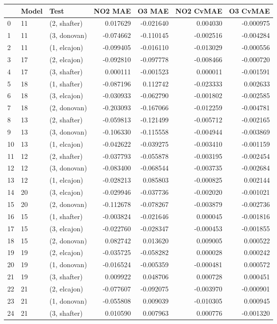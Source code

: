 \begin{tabular}{lllrrrr}
\toprule
{} & Model &          Test &   NO2 MAE &    O3 MAE &  NO2 CvMAE &  O3 CvMAE \\
\midrule
0  &    11 &  (2, shafter) &  0.017629 & -0.021640 &   0.004030 & -0.000975 \\
1  &    11 &  (3, donovan) & -0.074662 & -0.110145 &  -0.002516 & -0.004284 \\
2  &    11 &  (1, elcajon) & -0.099405 & -0.016110 &  -0.013029 & -0.000556 \\
3  &    17 &  (2, elcajon) & -0.092810 & -0.097778 &  -0.008466 & -0.000720 \\
4  &    17 &  (3, shafter) &  0.000111 & -0.001523 &   0.000011 & -0.001591 \\
5  &    18 &  (1, shafter) & -0.087196 &  0.112742 &  -0.023333 &  0.002633 \\
6  &    18 &  (3, elcajon) & -0.030933 & -0.062790 &  -0.001802 & -0.002585 \\
7  &    18 &  (2, donovan) & -0.203093 & -0.167066 &  -0.012259 & -0.004781 \\
8  &    13 &  (2, shafter) & -0.059813 & -0.121499 &  -0.005712 & -0.002165 \\
9  &    13 &  (3, donovan) & -0.106330 & -0.115558 &  -0.004944 & -0.003869 \\
10 &    13 &  (1, elcajon) & -0.042622 & -0.039275 &  -0.003410 & -0.001159 \\
11 &    12 &  (2, shafter) & -0.037793 & -0.055878 &  -0.003195 & -0.002454 \\
12 &    12 &  (3, donovan) & -0.083400 & -0.068544 &  -0.003735 & -0.002684 \\
13 &    12 &  (1, elcajon) & -0.028213 &  0.085803 &  -0.000825 &  0.002144 \\
14 &    20 &  (3, elcajon) & -0.029946 & -0.037736 &  -0.002020 & -0.001021 \\
15 &    20 &  (2, donovan) & -0.112678 & -0.078267 &  -0.003879 & -0.002736 \\
16 &    15 &  (1, shafter) & -0.003824 & -0.021646 &   0.000045 & -0.001816 \\
17 &    15 &  (3, elcajon) & -0.022760 & -0.028347 &  -0.000453 & -0.001855 \\
18 &    15 &  (2, donovan) &  0.082742 &  0.013620 &   0.009005 &  0.000522 \\
19 &    19 &  (2, elcajon) & -0.035725 & -0.058282 &   0.000028 &  0.000242 \\
20 &    19 &  (1, donovan) & -0.016524 & -0.005359 &  -0.000481 &  0.000572 \\
21 &    19 &  (3, shafter) &  0.009922 &  0.048706 &   0.000728 &  0.000451 \\
22 &    21 &  (2, elcajon) & -0.077607 & -0.092075 &  -0.003970 & -0.000901 \\
23 &    21 &  (1, donovan) & -0.055808 &  0.009039 &  -0.010305 &  0.000945 \\
24 &    21 &  (3, shafter) &  0.010590 &  0.007963 &   0.000776 & -0.001320 \\
\bottomrule
\end{tabular}
